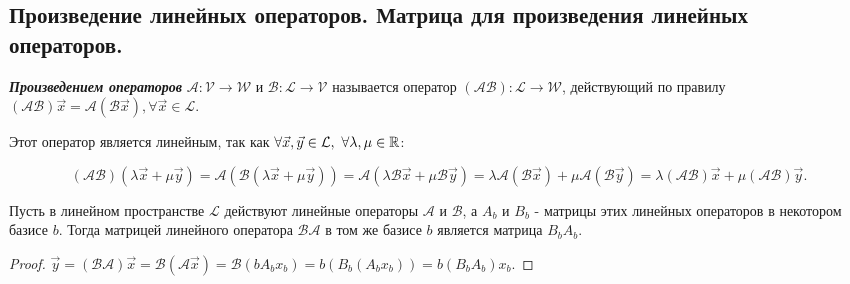 \newpage


\subsection{
    Произведение линейных операторов. Матрица для произведения 
    линейных операторов.
}

\begin{definition}
    \textbf{\textit{Произведением операторов}} $\mathscr{A} \colon \mathcal{V} \to \mathcal{W}$ и $\mathscr{B} \colon \mathcal{L} \to \mathcal{V}$ называется оператор $(\mathscr{A}\mathscr{B}) \colon \mathcal{L} \to \mathcal{W}$, действующий по правилу $(\mathscr{A}\mathscr{B})\vec{x} = \mathscr{A}(\mathscr{B}\vec{x}), \forall \vec{x} \in \mathcal{L}$. 
    
    Этот оператор является линейным, так как $\forall \vec{x}, \vec{y} \in \mathcal{L},\thinspace \thinspace \forall \lambda, \mu \in \mathbb{R}$:

    $$(\mathscr{A}\mathscr{B})(\lambda\vec{x} + \mu\vec{y}) = \mathscr{A}(\mathscr{B}(\lambda\vec{x} + \mu\vec{y})) = \mathscr{A}(\lambda\mathscr{B}\vec{x} + \mu\mathscr{B}\vec{y}) = \lambda\mathscr{A}(\mathscr{B}\vec{x}) + \mu\mathscr{A}(\mathscr{B}\vec{y}) = \lambda(\mathscr{A}\mathscr{B})\vec{x} + \mu(\mathscr{A}\mathscr{B})\vec{y}.$$
\end{definition}

\begin{theorem}
    Пусть в линейном пространстве $\mathcal{L}$ действуют линейные операторы $\mathscr{A}$ и $\mathscr{B}$, а $A_b$ и $B_b$ - матрицы этих линейных операторов в некотором базисе $b$. Тогда матрицей линейного оператора $\mathscr{B}\mathscr{A}$ в том же базисе $b$ является матрица $B_bA_b$.
\end{theorem}

\begin{proof}
    $\vec{y} = (\mathscr{B}\mathscr{A})\vec{x} = \mathscr{B}(\mathscr{A}\vec{x}) = \mathscr{B}(bA_bx_b) = b(B_b(A_bx_b)) = b(B_bA_b)x_b.$
\end{proof}
